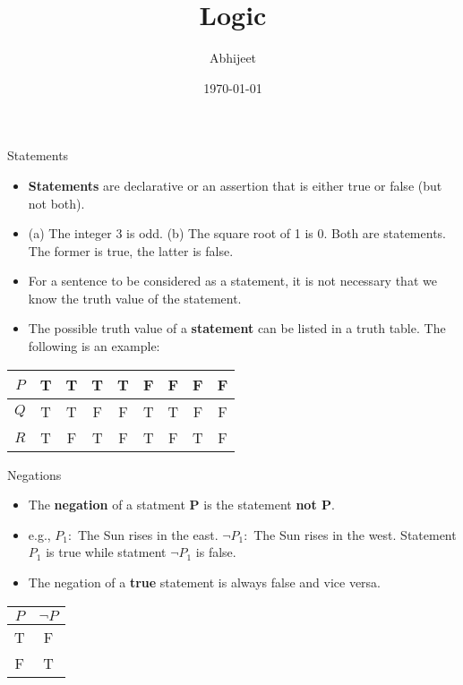 \documentclass{beamer}
\title{Logic}
\author{Abhijeet}
\institute{IGIDR}
\date{\today}
\begin{document}
\begin{frame}[plain]
  \titlepage
\end{frame}

\begin{frame}{Statements}
\begin{itemize}
    \item \textbf{Statements} are declarative or an assertion that is either true or false (but not both).
    \item (a) The integer 3 is odd. (b) The square root of 1 is 0. Both are statements. The former is true, the latter is false.
    \item For a sentence to be considered as a statement, it is not necessary that we know the truth value of the statement.
    \item The possible truth value of a \textbf{statement} can be listed in a truth table. The following is an example:
\end{itemize}

\begin{center}
\begin{tabular}{|c|c|c|c|c|c|c|c|c|}
    \hline
    $P$ & T & T & T & T & F & F & F & F \\
    \hline
    $Q$ & T & T & F & F & T & T & F & F \\
    \hline
    $R$ & T & F & T & F & T & F & T & F \\
    \hline
\end{tabular}
\end{center}

\end{frame}

\begin{frame}{Negations}
    \begin{itemize}
    \item The \textbf{negation} of a statment \textbf{P} is the statement \textbf{not P}.
    \item e.g., $P_{1}:$ The Sun rises in the east. $ \neg P_{1}:$ The Sun rises in the west. Statement $P_{1}$ is true while statment $ \neg P_{1}$ is false.
    \item The negation of a \textbf{true} statement is always false and vice versa. 
    \end{itemize}
\begin{center}
\begin{tabular}{|c|c|}
    \hline
    $P$ & $\neg P$ \\
    \hline
    T & F \\
    F & T \\
    \hline
\end{tabular}
\end{center}

\end{frame}
\end{document}
